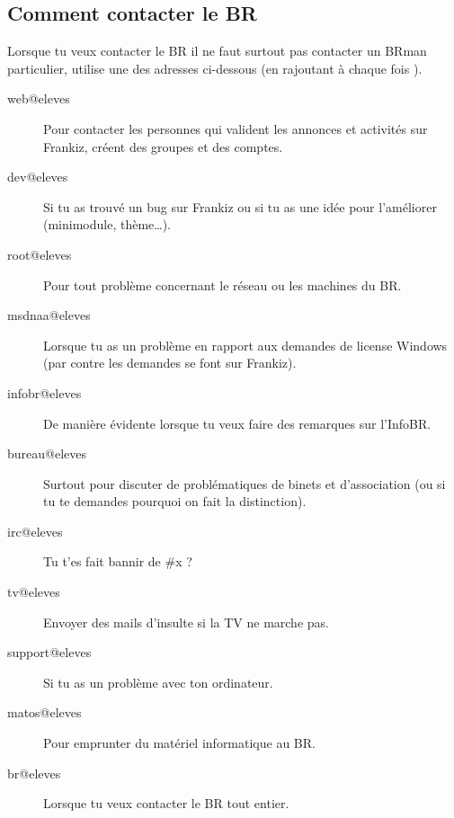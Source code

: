 \subsection{Comment contacter le BR}

Lorsque tu veux contacter le BR il ne faut surtout pas contacter un BRman particulier, utilise une des adresses ci-dessous (en rajoutant à chaque fois ).

\begin{description}

\item[web@eleves] Pour contacter les personnes qui valident les annonces et activités sur Frankiz, créent des groupes et des comptes.

\item[dev@eleves] Si tu as trouvé un bug sur Frankiz ou si tu as une idée pour l'améliorer (minimodule, thème\dots).

\item[root@eleves] Pour tout problème concernant le réseau ou les machines du BR.

\item[msdnaa@eleves] Lorsque tu as un problème en rapport aux demandes de license Windows (par contre les demandes se font sur Frankiz).

\item[infobr@eleves] De manière évidente lorsque tu veux faire des remarques sur l'InfoBR.

\item[bureau@eleves] Surtout pour discuter de problématiques de binets et d'association (ou si tu te demandes pourquoi on fait la distinction). 

\item[irc@eleves] Tu t'es fait bannir de \#x ?

\item[tv@eleves] Envoyer des mails d'insulte si la TV ne marche pas.

\item[support@eleves] Si tu as un problème avec ton ordinateur.

\item[matos@eleves] Pour emprunter du matériel informatique au BR.

\item[br@eleves] Lorsque tu veux contacter le BR tout entier.

\end{description}
